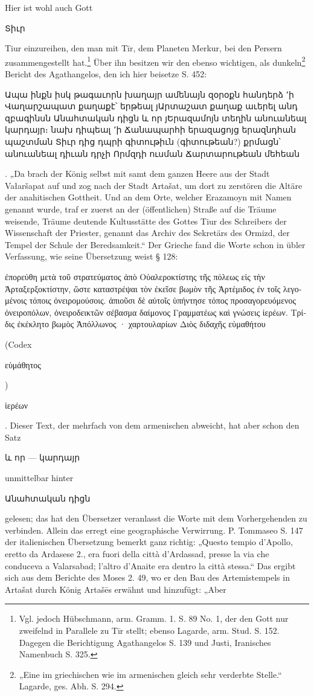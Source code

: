 \documentclass{article}
\begin{document}
Hier ist wohl auch Gott \begin{armenian}Տիւր\end{armenian} Tiur einzureihen, den man mit Tīr, dem Planeten Merkur, bei den Persern zusammengestellt hat.\footnote{Vgl. jedoch Hübschmann, arm. Gramm. 1. S. 89 No. 1, der den Gott nur zweifelnd in Parallele zu Tīr stellt; ebenso Lagarde, arm. Stud. S. 152. Dagegen die Berichtigung Agathangelos S. 139 und Justi, Iranisches Namenbuch S. 325.} Über ihn besitzen wir den ebenso wichtigen, als dunkeln\footnote{„Eine im griechischen wie im armenischen gleich sehr verderbte Stelle.“ Lagarde, ges. Abh. S. 294.} Bericht des Agathangelos, den ich hier beisetze S. 452: \begin{armenian}Ապա ինքն իսկ թագաւորն խաղայր ամենայն զօրօքն հանդերձ ՚ի Վաղարշապատ քաղաքէ՝ երթեալ յԱրտաշատ քաղաք աւերել անդ զբագինսն Անահտական դիցն և որ յԵրազամոյն տեղին անուանեալ կարդայր։ նախ դիպեալ ՚ի Ճանապարհի երազացոյց երազնդհան պաշտման Տիւր դից դպրի գիտութիւն (գիտութեան?) քրմացն՝ անուանեալ դիւան դրչի Որմզդի ուսման Ճարտարութեան մեհեան\end{armenian}. „Da brach der König selbst mit samt dem ganzen Heere aus der Stadt Vałaršapat auf und zog nach der Stadt Artašat, um dort zu zerstören die Altäre der anahitischen Gottheit. Und an dem Orte, welcher Erazamoyn mit Namen genannt wurde, traf er zuerst an der (öffentlichen) Straße auf die Träume weisende, Träume deutende Kultusstätte des Gottes Tiur des Schreibers der Wissenschaft der Priester, genannt das Archiv des Sekretärs des Ormizd, der Tempel der Schule der Beredsamkeit.“ Der Grieche fand die Worte schon in übler Verfassung, wie seine Übersetzung weist § 128: \begin{greek}ἐπορεύθη μετὰ τοῦ στρατεύματος ἀπὸ Οὐαλεροκτίστης τῆς πόλεως εἰς τὴν Ἀρταξερξοκτίστην, ὥστε καταστρέψαι τὸν ἐκεῖσε βωμὸν τῆς Ἀρτέμιδος ἐν τοῖς λεγομένοις τόποις ὀνειρομούσοις. ἀπιοῦσι δὲ αὐτοῖς ὑπήντησε τόπος προσαγορευόμενος ὀνειροπόλων, ὀνειροδεικτῶν σέβασμα δαίμονος Γραμματέως καὶ γνώσεις ἱερέων. Τρίδις ἐκέκλητο βωμὸς Ἀπόλλωνος · χαρτουλαρίων Διὸς διδαχῆς εὐμαθήτου\end{greek} (Codex \begin{greek}εὐμάθητος\end{greek}) \begin{greek}ἱερέων\end{greek}. Dieser Text, der mehrfach von dem armenischen abweicht, hat aber schon den Satz \begin{armenian}և որ — կարդայր\end{armenian} unmittelbar hinter \begin{armenian}Անահտական դիցն\end{armenian} gelesen; das hat den Übersetzer veranlasst die Worte mit dem Vorhergehenden zu verbinden. Allein das erregt eine geographische Verwirrung. P. Tommaseo S. 147 der italienischen Übersetzung bemerkt ganz richtig: „Questo tempio d'Apollo, eretto da Ardasese 2., era fuori della città d'Ardassad, presse la via che conduceva a Valarsabad; l'altro d'Anaite era dentro la città stessa.“ Das ergibt sich aus dem Berichte des Moses 2. 49, wo er den Bau des Artemistempels in Artašat durch König Artašēs erwähnt und hinzufügt: „Aber 
\end{document}
